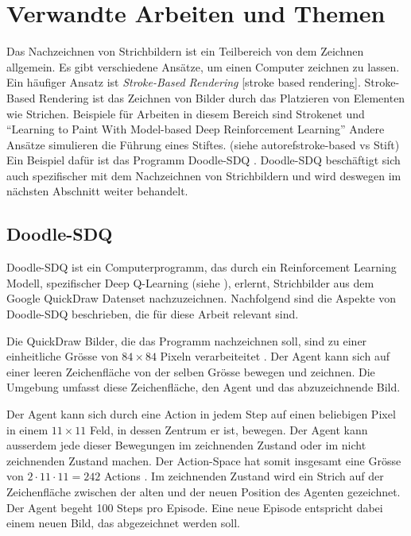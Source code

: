 \section{Verwandte Arbeiten und Themen}\label{chap:t_ver} Das Nachzeichnen von
Strichbildern ist ein Teilbereich von dem Zeichnen allgemein. Es gibt
verschiedene Ansätze, um einen Computer zeichnen zu lassen. Ein häufiger Ansatz
ist \emph{Stroke-Based Rendering} [stroke based rendering]. Stroke-Based %
Rendering ist das Zeichnen von Bilder durch das Platzieren von Elementen wie
Strichen. Beispiele für Arbeiten in diesem Bereich sind Strokenet
\cite{zheng_strokenet_2018} und ``Learning to Paint With Model-based Deep
Reinforcement Learning'' \cite{huang_learning_2019} Andere Ansätze simulieren
die Führung eines Stiftes. (siehe autoref{stroke-based vs Stift}) Ein Beispiel
dafür ist das Programm Doodle-SDQ \cite{zhou_learning_2018}. Doodle-SDQ
beschäftigt sich auch spezifischer mit dem Nachzeichnen von Strichbildern und
wird deswegen im nächsten Abschnitt weiter behandelt.


\subsection{Doodle-SDQ}\label{sub:t_ver_dood} Doodle-SDQ ist ein
Computerprogramm, das durch ein Reinforcement Learning Modell, spezifischer Deep
Q-Learning (siehe ), erlernt, Strichbilder aus dem Google
QuickDraw Datenset \cite{noauthor_quick_2022}
nachzuzeichnen. Nachfolgend sind die Aspekte von Doodle-SDQ beschrieben, die für
diese Arbeit relevant sind.

Die QuickDraw Bilder, die das Programm nachzeichnen soll, sind zu einer
einheitliche Grösse von $84\times84$ Pixeln verarbeiteitet \cite[S.
7]{zhou_learning_2018}. Der Agent kann sich auf einer leeren Zeichenfläche von
der selben Grösse bewegen und zeichnen. Die Umgebung umfasst diese
Zeichenfläche, den Agent und das abzuzeichnende Bild.

Der Agent kann sich durch eine Action in jedem Step auf einen beliebigen Pixel
in einem $11\times11$ Feld, in dessen Zentrum er ist, bewegen. Der Agent kann
ausserdem jede dieser Bewegungen im zeichnenden Zustand oder im nicht
zeichnenden Zustand machen. Der Action-Space hat somit insgesamt eine Grösse von
$2\cdot11\cdot11 = 242$ Actions \cite[S. 5]{zhou_learning_2018}. Im zeichnenden
Zustand wird ein Strich auf der Zeichenfläche zwischen der alten und der neuen
Position des Agenten gezeichnet. Der Agent begeht 100 Steps pro Episode. Eine
neue Episode entspricht dabei einem neuen Bild, das abgezeichnet werden soll.

